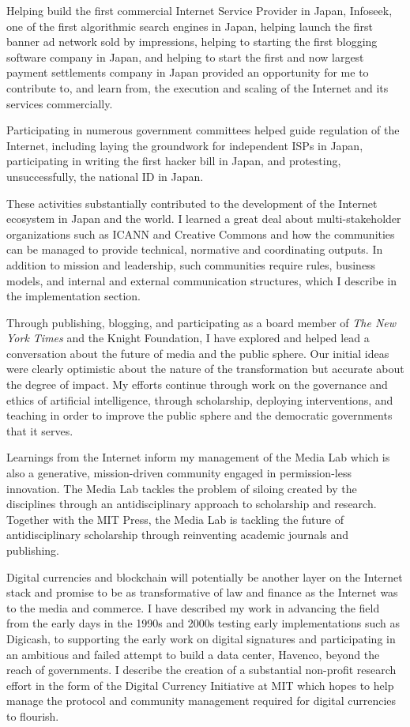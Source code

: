 Helping build the first commercial Internet Service Provider in Japan, Infoseek, one of the first algorithmic search engines in Japan, helping launch the first banner ad network sold by impressions, helping to starting the first blogging software company in Japan, and helping to start the first and now largest payment settlements company in Japan provided an opportunity for me to contribute to, and learn from, the execution and scaling of the Internet and its services commercially.

Participating in numerous government committees helped guide regulation of the Internet, including laying the groundwork for independent ISPs in Japan, participating in writing the first hacker bill in Japan, and protesting, unsuccessfully, the national ID in Japan.

These activities substantially contributed to the development of the Internet ecosystem in Japan and the world. I learned a great deal about multi-stakeholder organizations such as \ac{ICANN} and Creative Commons and how the communities can be managed to provide technical, normative and coordinating outputs. In addition to mission and leadership, such communities require rules, business models, and internal and external communication structures, which I describe in the implementation section.

Through publishing, blogging, and participating as a board member of \textit{The New York Times} and the Knight Foundation, I have explored and helped lead a conversation about the future of media and the public sphere. Our initial ideas were clearly optimistic about the nature of the transformation but accurate about the degree of impact. My efforts continue through work on the governance and ethics of artificial intelligence, through scholarship, deploying interventions, and teaching in order to improve the public sphere and the democratic governments that it serves.

Learnings from the Internet inform my management of the Media Lab which is also a generative, mission-driven community engaged in permission-less innovation. The Media Lab tackles the problem of siloing created by the disciplines through an antidisciplinary approach to scholarship and research. Together with the MIT Press, the Media Lab is tackling the future of antidisciplinary scholarship through reinventing academic journals and publishing.

Digital currencies and blockchain will potentially be another layer on the Internet stack and promise to be as transformative of law and finance as the Internet was to the media and commerce. I have described my work in advancing the field from the early days in the 1990s and 2000s testing early implementations such as Digicash, to supporting the early work on digital signatures and participating in an ambitious and failed attempt to build a data center, Havenco, beyond the reach of governments. I describe the creation of a substantial non-profit research effort in the form of the Digital Currency Initiative at MIT which hopes to help manage the protocol and community management required for digital currencies to flourish.

